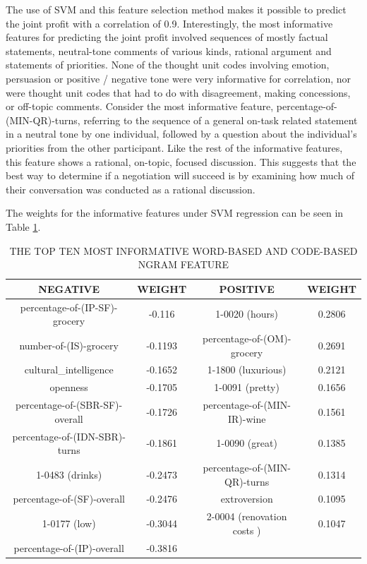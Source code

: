 \documentclass[11pt]{article} %
\begin{document}
The use of SVM and this feature selection method makes it possible to predict the joint profit with a correlation of 0.9.  Interestingly, the most informative features for predicting the joint profit involved sequences of mostly factual statements, neutral-tone comments of various kinds, rational argument and statements of priorities.  None of the thought unit codes involving emotion, persuasion or positive / negative tone were very informative for correlation, nor were thought unit codes that had to do with disagreement, making concessions, or off-topic comments.  Consider the most informative feature, percentage-of-(MIN-QR)-turns, referring to the sequence of a general on-task related statement in a neutral tone by one individual, followed by a question about the individual's priorities from the other participant.  Like the rest of the informative features, this feature shows a rational, on-topic, focused discussion.  This suggests that the best way to determine if a negotiation will succeed is by examining how much of their conversation was conducted as a rational discussion.

The weights for the informative features under SVM regression can be seen in Table \ref{tab:ftr_weights}.

\begin{table}
  \centering
  \caption{THE TOP TEN MOST INFORMATIVE WORD-BASED AND CODE-BASED NGRAM FEATURE}
  \begin{tabular}{|c|c| c | c|}
     \hline
NEGATIVE & WEIGHT & POSITIVE & WEIGHT \\
  \hline
percentage-of-(IP-SF)-grocery & -0.116 & 1-0020 (hours) & 0.2806 \\
number-of-(IS)-grocery & -0.1193 & percentage-of-(OM)-grocery & 0.2691 \\
cultural_intelligence & -0.1652 & 1-1800 (luxurious) & 0.2121 \\
openness & -0.1705 & 1-0091 (pretty) & 0.1656 \\
percentage-of-(SBR-SF)-overall & -0.1726 & percentage-of-(MIN-IR)-wine & 0.1561 \\
percentage-of-(IDN-SBR)-turns & -0.1861 & 1-0090 (great) & 0.1385 \\
1-0483 (drinks) & -0.2473 & percentage-of-(MIN-QR)-turns & 0.1314 \\
percentage-of-(SF)-overall & -0.2476 & extroversion & 0.1095 \\
1-0177 (low) & -0.3044 & 2-0004 (renovation costs ) & 0.1047 \\
percentage-of-(IP)-overall & -0.3816 & & \\
  \hline
  \end{tabular}\label{tab:ftr_weights}
\end{table}
\end{document}
